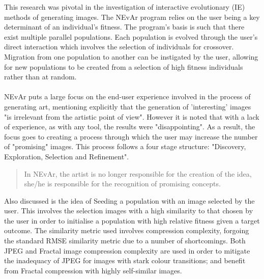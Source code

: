\documentclass[10pt,a4paper]{article}
\begin{document}
This research was pivotal in the investigation of interactive evolutionary (IE) methods of generating images.
The NEvAr program relies on the user being a key determinant of an individual's fitness.
The program's basis is such that there exist multiple parallel populations.
Each population is evolved through the user's direct interaction which involves the selection of individuals for crossover.
Migration from one population to another can be instigated by the user, allowing for new populations to be created from a selection of high fitness individuals rather than at random.
\\\\
NEvAr puts a large focus on the end-user experience involved in the process of generating art, mentioning explicitly that the generation of 'interesting' images "is irrelevant from the artistic point of view".
However it is noted that with a lack of experience, as with any tool, the results were "disappointing".
As a result, the focus goes to creating a process through which the user may increase the number of "promising" images.
This process follows a four stage structure: "Discovery, Exploration, Selection and Refinement".
\begin{quotation}
In NEvAr, the artist is no longer responsible for the creation of the idea, she/he is responsible for the recognition of promising concepts.
\end{quotation}

Also discussed is the idea of Seeding a population with an image selected by the user.
This involves the selection images with a high similarity to that chosen by the user in order to initialise a population with high relative fitness given a target outcome.
The similarity metric used involves compression complexity, forgoing the standard RMSE similarity metric due to a number of shortcomings.
Both JPEG and Fractal image compression complexity are used in order to mitigate the inadequacy of JPEG for images with stark colour transitions; and benefit from Fractal compression with highly self-similar images.


\pagebreak
\end{document}
